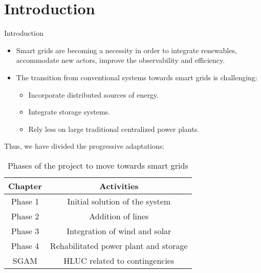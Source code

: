 \section{Introduction}
\begin{frame}{Introduction}
  \begin{itemize}
  \item Smart grids are becoming a necessity in order to integrate renewables, accommodate new actors, improve the observability and efficiency.
    \item The transition from conventional systems towards smart grids is challenging:
      \begin{itemize}
        \item Incorporate distributed sources of energy.
        \item Integrate storage systems.
        \item Rely less on large traditional centralized power plants.
      \end{itemize}
  \end{itemize}
  Thus, we have divided the progressive adaptations:
  \begin{table}\footnotesize
    \begin{tabular}{cc}
      \hline
      \textbf{Chapter} & \textbf{Activities} \\
      \hline
      \hline
      Phase 1 & Initial solution of the system \\
      Phase 2 & Addition of lines \\
      Phase 3 & Integration of wind and solar \\
      Phase 4 & Rehabilitated power plant and storage \\
      SGAM & HLUC related to contingencies \\
      \hline
    \end{tabular}
    \caption{Phases of the project to move towards smart grids}
  \end{table}
\end{frame}

